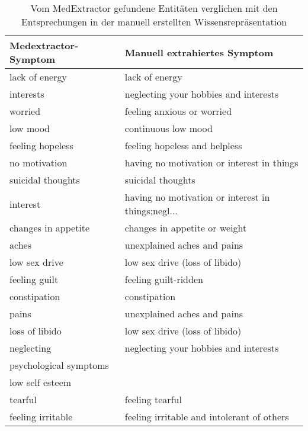 \begin{table}
\begin{center}
\begin{tabular}{ll}
\toprule
  Medextractor-Symptom &                       Manuell extrahiertes Symptom \\
\midrule
        lack of energy &                                     lack of energy \\
             interests &              neglecting your hobbies and interests \\
               worried &                         feeling anxious or worried \\
              low mood &                                continuous low mood \\
      feeling hopeless &                      feeling hopeless and helpless \\
         no motivation &         having no motivation or interest in things \\
     suicidal thoughts &                                  suicidal thoughts \\
              interest & having no motivation or interest in things;negl... \\
   changes in appetite &                      changes in appetite or weight \\
                 aches &                        unexplained aches and pains \\
         low sex drive &                     low sex drive (loss of libido) \\
         feeling guilt &                               feeling guilt-ridden \\
          constipation &                                       constipation \\
                 pains &                        unexplained aches and pains \\
        loss of libido &                     low sex drive (loss of libido) \\
            neglecting &              neglecting your hobbies and interests \\
psychological symptoms &                                                    \\
       low self esteem &                                                    \\
               tearful &                                    feeling tearful \\
     feeling irritable &         feeling irritable and intolerant of others \\
\bottomrule
\end{tabular}
\caption{Vom MedExtractor gefundene Entitäten verglichen mit den Entsprechungen in der manuell erstellten Wissensrepräsentation}
\label{tab:vergleich_medextractor_manuell}
\end{center}
\end{table}

